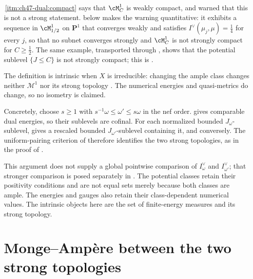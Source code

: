 \begin{remark}
\label{rem:ch48-measure-weak-not-strong}
\,\cref{itm:ch47-dual:compact} says that
$\cM^1_C$ is weakly compact, and
 warned that this is not a strong statement.
 below makes the warning quantitative: it
exhibits a sequence in $\cM^1_{1/2}$ on $\mathbf P^1$ that converges
weakly and satisfies $I^\vee(\mu_j,\mu)=\tfrac14$ for every $j$, so that
no subnet converges strongly and $\cM^1_C$ is not strongly compact for
$C\ge\tfrac12$.  The same example, transported through
, shows that the potential sublevel
$\{J\le C\}$ is not strongly compact; this is
.
\end{remark}

\begin{remark}
\label{rem:ch48-intrinsic}
The definition is intrinsic when $X$ is irreducible: changing the ample
class changes neither $\mathcal M^1$ nor its strong topology
\cite[Corollary~9.21 and Proposition~10.16]{BJ22}.  The numerical energies
and quasi-metrics do change, so no isometry is claimed.

Concretely, choose $s\ge1$ with
$s^{-1}\omega\le\omega'\le s\omega$ in the nef order.
\cite[Theorem~9.24]{BJ22} gives comparable dual energies, so their
sublevels are cofinal. For each normalized bounded
$J_\omega$-sublevel, \cite[Lemma~9.25]{BJ22} gives a rescaled
bounded $J_{\omega'}$-sublevel containing it, and conversely.
The uniform-pairing criterion of 
therefore identifies the two strong topologies, as in the proof of
\cite[Proposition~10.16]{BJ22}.

This argument does not supply a global pointwise comparison of
$I^\vee_\omega$ and $I^\vee_{\omega'}$; that stronger comparison is
posed separately in \cite[Remark~10.17]{BJ22}.
The potential classes retain their positivity conditions and are
not equal sets merely because both classes are ample. The energies and
gauges also retain their class-dependent numerical values.
The intrinsic objects here are the set of finite-energy measures
and its strong topology.

\end{remark}

\section{Monge--Amp\`ere between the two strong topologies}
\label{sec:ch48-ma}

